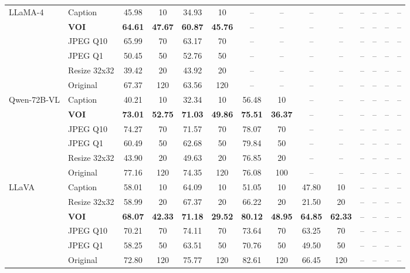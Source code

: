 \begin{table}[p]
{\begin{tabular}{llcccccccccccc}
\multirow{6}{*}{LLaMA-4}
& Caption        & 45.98 & 10 & 34.93 & 10 & -- & -- & -- & -- & -- & -- & -- & -- \\
& \textbf{VOI}          & \textbf{64.61} & \textbf{47.67} & \textbf{60.87} & \textbf{45.76} & -- & -- & -- & -- & -- & -- & -- & -- \\
& JPEG Q10       & 65.99 & 70 & 63.17 & 70 & -- & -- & -- & -- & -- & -- & -- & -- \\
& JPEG Q1        & 50.45 & 50 & 52.76 & 50 & -- & -- & -- & -- & -- & -- & -- & -- \\
& Resize 32x32   & 39.42 & 20 & 43.92 & 20 & -- & -- & -- & -- & -- & -- & -- & -- \\
& Original       & 67.37 & 120 & 63.56 & 120 & -- & -- & -- & -- & -- & -- & -- & -- \\
\midrule

\multirow{6}{*}{Qwen-72B-VL}
& Caption        & 40.21 & 10 & 32.34 & 10 & 56.48 & 10& -- & -- & -- & -- & -- & -- \\
& \textbf{VOI}          & \textbf{73.01} & \textbf{52.75} & \textbf{71.03} & \textbf{49.86} & \textbf{75.51} & \textbf{36.37}& -- & -- & -- & -- & -- & -- \\
& JPEG Q10       & 74.27 & 70 & 71.57 & 70 & 78.07 & 70 & -- & -- & -- & -- & -- & -- \\
& JPEG Q1        & 60.49 & 50 & 62.68 & 50 & 79.84 & 50 & -- & -- & -- & -- & -- & -- \\
& Resize 32x32   & 43.90 & 20 & 49.63 & 20 & 76.85 & 20 & -- & -- & -- & -- & -- & -- \\
& Original       & 77.16 & 120 & 74.35 & 120 & 76.08 & 100 & -- & -- & -- & -- & -- & -- \\
\midrule

\multirow{6}{*}{LLaVA}
& Caption        & 58.01 & 10 & 64.09 & 10 & 51.05 & 10& 47.80 & 10 & -- & -- & -- & -- \\
& Resize 32x32   & 58.99 & 20 & 67.37 & 20 & 66.22 & 20 & 21.50 & 20 & -- & -- & -- & -- \\
& \textbf{VOI}          & \textbf{68.07} & \textbf{42.33} & \textbf{71.18} & \textbf{29.52} & \textbf{80.12} & \textbf{48.95}& \textbf{64.85} & \textbf{62.33} & -- & -- & -- & -- \\
& JPEG Q10       & 70.21 & 70 & 74.11 & 70 & 73.64 & 70 & 63.25 & 70 & -- & -- & -- & -- \\
& JPEG Q1        & 58.25 & 50 & 63.51 & 50 & 70.76 & 50 & 49.50 & 50 & -- & -- & -- & -- \\
& Original       & 72.80 & 120 & 75.77 & 120 & 82.61 & 120 & 66.45 & 120 & -- & -- & -- & -- \\
\midrule


\end{tabular}}
\end{table}
